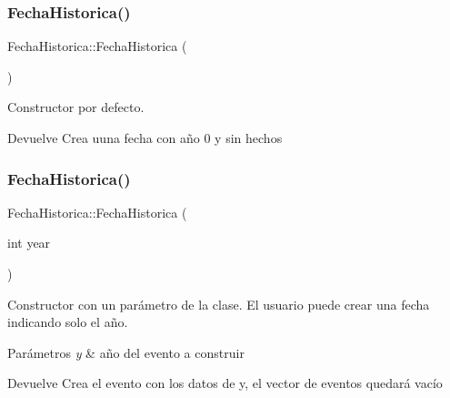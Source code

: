 \subsubsection{\texorpdfstring{Fecha\+Historica()}{FechaHistorica()}\hspace{0.1cm}{\footnotesize\ttfamily [1/3]}}
{\footnotesize\ttfamily Fecha\+Historica\+::\+Fecha\+Historica (\begin{DoxyParamCaption}{ }\end{DoxyParamCaption})}



Constructor por defecto. 

\begin{DoxyReturn}{Devuelve}
Crea uuna fecha con año 0 y sin hechos 
\end{DoxyReturn}
\mbox{\label{classFechaHistorica_abf2f8b43afe7baae644fcc8315236eb4}} 
\subsubsection{\texorpdfstring{Fecha\+Historica()}{FechaHistorica()}\hspace{0.1cm}{\footnotesize\ttfamily [2/3]}}
{\footnotesize\ttfamily Fecha\+Historica\+::\+Fecha\+Historica (\begin{DoxyParamCaption}\item[{int}]{year }\end{DoxyParamCaption})}



Constructor con un parámetro de la clase. El usuario puede crear una fecha indicando solo el año. 


\begin{DoxyParams}{Parámetros}
{\em y} & año del evento a construir \\
\hline
\end{DoxyParams}
\begin{DoxyReturn}{Devuelve}
Crea el evento con los datos de y, el vector de eventos quedará vacío 
\end{DoxyReturn}
\mbox{\label{classFechaHistorica_a40a9c133a139d41bf84406e09022feaf}} 
